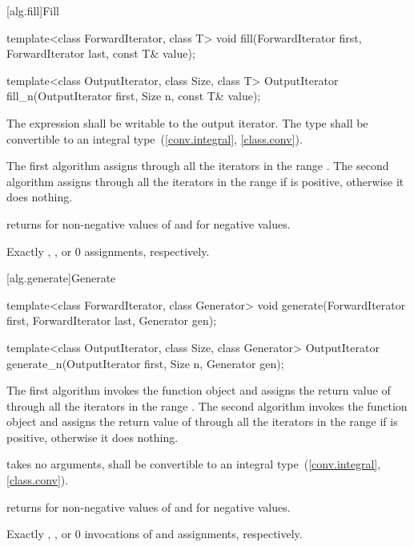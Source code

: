 [alg.fill]{Fill}

%
%
\begin{itemdecl}
template<class ForwardIterator, class T>
  void fill(ForwardIterator first, ForwardIterator last, const T& value);

template<class OutputIterator, class Size, class T>
  OutputIterator fill_n(OutputIterator first, Size n, const T& value);
\end{itemdecl}

\begin{itemdescr}
\pnum
\requires
The expression
shall be writable to the output iterator. The type
shall be convertible to an integral type~(\ref{conv.integral}, \ref{class.conv}).

\pnum
\effects
The first algorithm assigns  through all the iterators in the range
. The second algorithm assigns 
through all the iterators in the range 
if  is positive, otherwise it does nothing.

\pnum
\returns {} returns  for non-negative values of 
and  for negative values.

\pnum
\complexity
Exactly
,
, or 0 assignments, respectively.
\end{itemdescr}

[alg.generate]{Generate}

%
%
\begin{itemdecl}
template<class ForwardIterator, class Generator>
  void generate(ForwardIterator first, ForwardIterator last,
                Generator gen);

template<class OutputIterator, class Size, class Generator>
  OutputIterator generate_n(OutputIterator first, Size n, Generator gen);
\end{itemdecl}

\begin{itemdescr}
\pnum
\effects
The first algorithm invokes the function object  and assigns the return
value of  through all the iterators in the range
. The second algorithm invokes the function object
 and assigns the return value of  through all the iterators in
the range  if  is positive,
otherwise it does nothing.

\pnum
\requires
{} takes no arguments,
shall be convertible to an integral type~(\ref{conv.integral}, \ref{class.conv}).

\pnum
\returns {} returns  for non-negative values of 
and  for negative values.

\pnum
\complexity
Exactly
,
, or 0
invocations of  and assignments, respectively.
\end{itemdescr}

